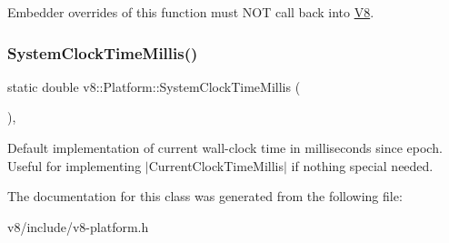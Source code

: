 Embedder overrides of this function must N\+OT call back into \mbox{\hyperlink{classv8_1_1V8}{V8}}. \mbox{\label{classv8_1_1Platform_a18ccdaf3a1a738bd4082dbbe749d026b}} 
\subsubsection{\texorpdfstring{System\+Clock\+Time\+Millis()}{SystemClockTimeMillis()}}
{\footnotesize\ttfamily static double v8\+::\+Platform\+::\+System\+Clock\+Time\+Millis (\begin{DoxyParamCaption}{ }\end{DoxyParamCaption})\hspace{0.3cm}{\ttfamily [static]}, {\ttfamily [protected]}}

Default implementation of current wall-\/clock time in milliseconds since epoch. Useful for implementing $\vert$\+Current\+Clock\+Time\+Millis$\vert$ if nothing special needed. 

The documentation for this class was generated from the following file\+:\begin{DoxyCompactItemize}
\item 
v8/include/v8-\/platform.\+h\end{DoxyCompactItemize}
